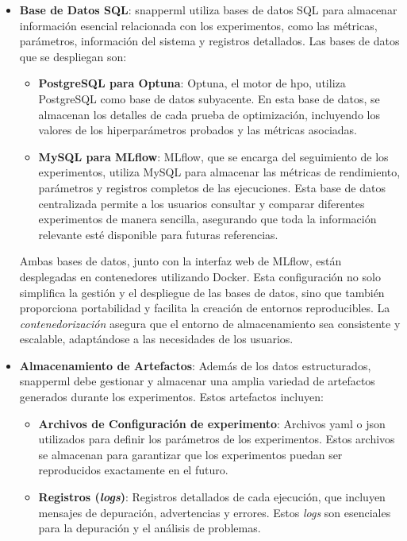 \begin{itemize}
    \item \textbf{Base de Datos SQL}: \Gls{snapperml} utiliza bases de datos SQL para almacenar información esencial relacionada con los experimentos, como las métricas, parámetros, información del sistema y registros detallados. Las bases de datos que se despliegan son:
          \begin{itemize}
              \item \textbf{PostgreSQL para Optuna}: Optuna, el motor de \acrlong{hpo}, utiliza PostgreSQL como base de datos subyacente. En esta base de datos, se almacenan los detalles de cada prueba de optimización, incluyendo los valores de los hiperparámetros probados y las métricas asociadas.
              \item \textbf{MySQL para MLflow}: MLflow, que se encarga del seguimiento de los experimentos, utiliza MySQL para almacenar las métricas de rendimiento, parámetros y registros completos de las ejecuciones. Esta base de datos centralizada permite a los usuarios consultar y comparar diferentes experimentos de manera sencilla, asegurando que toda la información relevante esté disponible para futuras referencias.
          \end{itemize} Ambas bases de datos, junto con la interfaz web de MLflow, están desplegadas en contenedores utilizando Docker. Esta configuración no solo simplifica la gestión y el despliegue de las bases de datos, sino que también proporciona portabilidad y facilita la creación de entornos reproducibles. La \textit{contenedorización} asegura que el entorno de almacenamiento sea consistente y escalable, adaptándose a las necesidades de los usuarios.
    \item \textbf{Almacenamiento de Artefactos}: Además de los datos estructurados, \Gls{snapperml} debe gestionar y almacenar una amplia variedad de \gls{artefactos} generados durante los experimentos. Estos \gls{artefactos} incluyen:
          \begin{itemize}
              \item \textbf{Archivos de Configuración de experimento}: Archivos \acrshort{yaml} o \acrshort{json} utilizados para definir los parámetros de los experimentos. Estos archivos se almacenan para garantizar que los experimentos puedan ser reproducidos exactamente en el futuro.
              \item \textbf{Registros (\textit{\Glspl{log}})}: Registros detallados de cada ejecución, que incluyen mensajes de depuración, advertencias y errores. Estos \textit{\glspl{log}} son esenciales para la depuración y el análisis de problemas.

\end{itemize}
\end{itemize}

